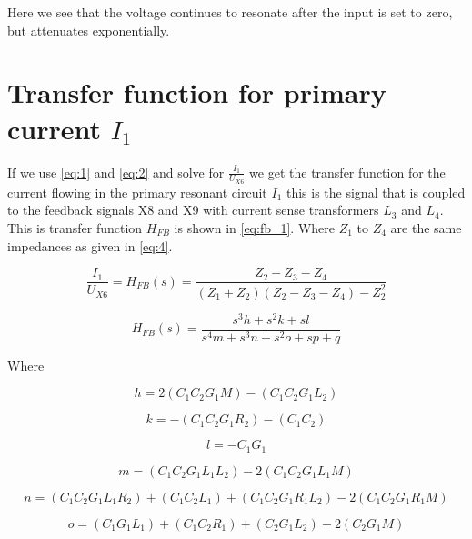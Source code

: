 Here we see that the voltage continues to resonate after the input is set to zero, but attenuates exponentially.

\newpage
\section{Transfer function for primary current $I_1$}
\label{sec:mod_fb}
If we use \cref{eq:1} and \cref{eq:2} and solve for $\frac{I_1}{U_{X6}}$ we get the transfer function for the current flowing in the primary resonant circuit $I_1$ this is the signal that is coupled to the feedback signals X8 and X9 with current sense transformers $L_3$ and $L_4$. This is transfer function $H_{FB}$ is shown in \cref{eq:fb_1}. Where $Z_1$ to $Z_4$ are the same impedances as given in \cref{eq:4}.

\begin{equation} \label{eq:fb_1}
\frac{I_1}{U_{X6}} = H_{FB}(s) = \frac{Z_2-Z_3-Z_4}{(Z_1+Z_2)(Z_2-Z_3-Z_4)-Z_2^2}
\end{equation}

\begin{equation} \label{eq:fb_2}
    H_{FB}(s) = \frac{s^3 h + s^2 k + s l}{s^4 m + s^3 n + s^2 o + s p + q}
\end{equation}

Where

\begin{equation}
    h = 2(C_1 C_2 G_1 M) - (C_1 C_2 G_1 L_2)
\end{equation}

\begin{equation}
    k = -(C_1 C_2 G_1 R_2) - (C_1 C_2)
\end{equation}

\begin{equation}
    l = -C_1 G_1
\end{equation}

\begin{equation}
    m = (C_1 C_2 G_1 L_1 L_2)-2(C_1 C_2 G_1 L_1 M)
\end{equation}

\begin{equation} \label{eq:fb_n}
    n = (C_1 C_2 G_1 L_1 R_2) + (C_1 C_2 L_1) + (C_1 C_2 G_1 R_1 L_2) - 2(C_1 C_2 G_1 R_1 M)
\end{equation}

\begin{equation} \label{eq:fb_o}
    o = (C_1 G_1 L_1) + (C_1 C_2 R_1) + (C_2 G_1 L_2) -2(C_2 G_1 M)
\end{equation}

